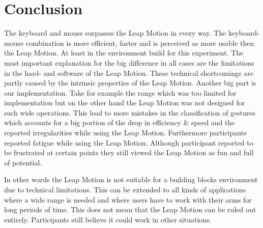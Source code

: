 \section{Conclusion}
The keyboard and mouse surpasses the Leap Motion in every way. The keyboard-mouse combination is more efficient, faster and is perceived as more usable then the Leap Motion.
 At least in the environment build for this experiment. The most important explanation for the big difference in all cases are the limitations in the hard- and software of the
 Leap Motion. These technical shortcomings are partly caused by the intrinsic properties of the Leap Motion. Another big part is our implementation. Take for example the range 
 which was too limited for implementation but on the other hand the Leap Motion was not designed for such wide operations. This lead to more mistakes in the classification of gestures 
 which accounts for a big portion of the drop in efficiency \& speed and the reported irregularities while using the Leap Motion. Furthermore participants reported fatigue while using 
 the Leap Motion. Although participant reported to be frustrated at certain points they still viewed the Leap Motion as fun and full of potential.  

In other words the Leap Motion is not suitable for a building blocks environment due to technical limitations. This can be extended to all kinds of applications where a wide range is 
needed and where users have to work with their arms for long periods of time. This does not mean that the Leap Motion can be ruled out entirely. Participants still believe it could 
work in other situations.
